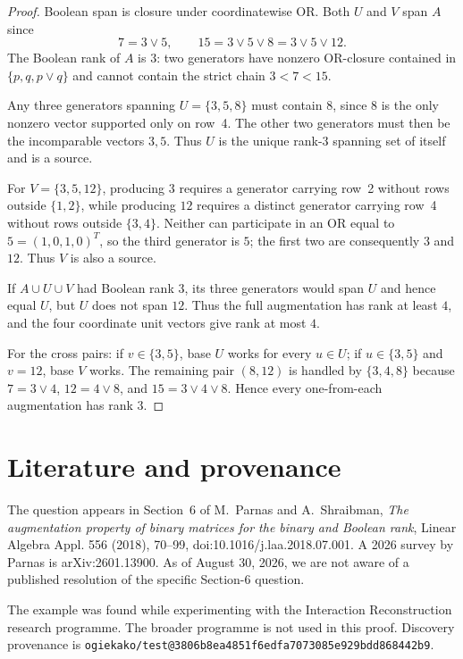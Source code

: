 \documentclass[11pt]{article}
\begin{document}
\begin{proof}
Boolean span is closure under coordinatewise OR. Both $U$ and $V$ span $A$ since
\[
7=3\vee5,\qquad 15=3\vee5\vee8=3\vee5\vee12.
\]
The Boolean rank of $A$ is $3$: two generators have nonzero OR-closure contained in $\{p,q,p\vee q\}$ and cannot contain the strict chain $3<7<15$.

Any three generators spanning $U=\{3,5,8\}$ must contain $8$, since $8$ is the only nonzero vector supported only on row~4. The other two generators must then be the incomparable vectors $3,5$. Thus $U$ is the unique rank-$3$ spanning set of itself and is a source.

For $V=\{3,5,12\}$, producing $3$ requires a generator carrying row~2 without rows outside $\{1,2\}$, while producing $12$ requires a distinct generator carrying row~4 without rows outside $\{3,4\}$. Neither can participate in an OR equal to $5=(1,0,1,0)^T$, so the third generator is $5$; the first two are consequently $3$ and $12$. Thus $V$ is also a source.

If $A\cup U\cup V$ had Boolean rank $3$, its three generators would span $U$ and hence equal $U$, but $U$ does not span $12$. Thus the full augmentation has rank at least $4$, and the four coordinate unit vectors give rank at most $4$.

For the cross pairs: if $v\in\{3,5\}$, base $U$ works for every $u\in U$; if $u\in\{3,5\}$ and $v=12$, base $V$ works. The remaining pair $(8,12)$ is handled by $\{3,4,8\}$ because $7=3\vee4$, $12=4\vee8$, and $15=3\vee4\vee8$. Hence every one-from-each augmentation has rank $3$.
\end{proof}

\section{Literature and provenance}
The question appears in Section~6 of M.~Parnas and A.~Shraibman, \emph{The augmentation property of binary matrices for the binary and Boolean rank}, Linear Algebra Appl. 556 (2018), 70--99, doi:10.1016/j.laa.2018.07.001. A 2026 survey by Parnas is arXiv:2601.13900. As of August 30, 2026, we are not aware of a published resolution of the specific Section-6 question.

The example was found while experimenting with the Interaction Reconstruction research programme. The broader programme is not used in this proof. Discovery provenance is \texttt{ogiekako/test@3806b8ea4851f6edfa7073085e929bdd868442b9}.
\end{document}
